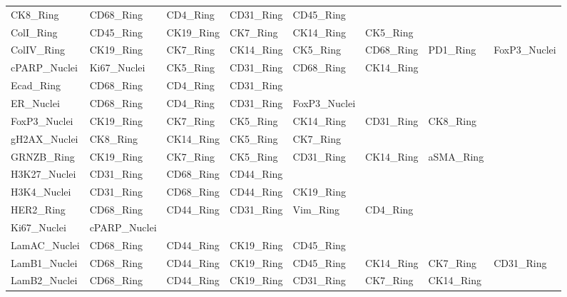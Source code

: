 \documentclass[preprint,review,3p,12pt]{elsarticle}
\begin{document}
\begin{supptable}[p]
{\begin{tabular}{l | l l l l l l l}
CK8\_Ring     & CD68\_Ring    & CD4\_Ring     & CD31\_Ring  & CD45\_Ring    &               &               &               \\
ColI\_Ring    & CD45\_Ring    & CK19\_Ring    & CK7\_Ring   & CK14\_Ring    & CK5\_Ring     &               &               \\
ColIV\_Ring   & CK19\_Ring    & CK7\_Ring     & CK14\_Ring  & CK5\_Ring     & CD68\_Ring    & PD1\_Ring     & FoxP3\_Nuclei \\
cPARP\_Nuclei & Ki67\_Nuclei  & CK5\_Ring     & CD31\_Ring  & CD68\_Ring    & CK14\_Ring    &               &               \\
Ecad\_Ring    & CD68\_Ring    & CD4\_Ring     & CD31\_Ring  &               &               &               &               \\
ER\_Nuclei    & CD68\_Ring    & CD4\_Ring     & CD31\_Ring  & FoxP3\_Nuclei &               &               &               \\
FoxP3\_Nuclei & CK19\_Ring    & CK7\_Ring     & CK5\_Ring   & CK14\_Ring    & CD31\_Ring    & CK8\_Ring     &               \\
gH2AX\_Nuclei & CK8\_Ring     & CK14\_Ring    & CK5\_Ring   & CK7\_Ring     &               &               &               \\
GRNZB\_Ring   & CK19\_Ring    & CK7\_Ring     & CK5\_Ring   & CD31\_Ring    & CK14\_Ring    & aSMA\_Ring    &               \\
H3K27\_Nuclei & CD31\_Ring    & CD68\_Ring    & CD44\_Ring  &               &               &               &               \\
H3K4\_Nuclei  & CD31\_Ring    & CD68\_Ring    & CD44\_Ring  & CK19\_Ring    &               &               &               \\
HER2\_Ring    & CD68\_Ring    & CD44\_Ring    & CD31\_Ring  & Vim\_Ring     & CD4\_Ring     &               &               \\
Ki67\_Nuclei  & cPARP\_Nuclei &               &             &               &               &               &               \\
LamAC\_Nuclei & CD68\_Ring    & CD44\_Ring    & CK19\_Ring  & CD45\_Ring    &               &               &               \\
LamB1\_Nuclei & CD68\_Ring    & CD44\_Ring    & CK19\_Ring  & CD45\_Ring    & CK14\_Ring    & CK7\_Ring     & CD31\_Ring    \\
LamB2\_Nuclei & CD68\_Ring    & CD44\_Ring    & CK19\_Ring  & CD31\_Ring    & CK7\_Ring     & CK14\_Ring    &               \\

\end{tabular}}
\end{supptable}
\end{document}
